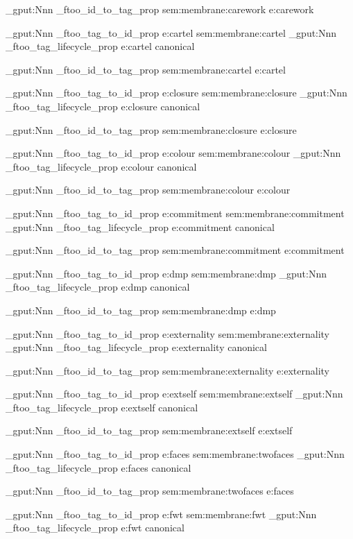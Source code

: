 \prop_gput:Nnn \g_ftoo_id_to_tag_prop { sem:membrane:carework } { e:carework }


\prop_gput:Nnn \g_ftoo_tag_to_id_prop { e:cartel } { sem:membrane:cartel }
\prop_gput:Nnn \g_ftoo_tag_lifecycle_prop { e:cartel } { canonical }

\prop_gput:Nnn \g_ftoo_id_to_tag_prop { sem:membrane:cartel } { e:cartel }


\prop_gput:Nnn \g_ftoo_tag_to_id_prop { e:closure } { sem:membrane:closure }
\prop_gput:Nnn \g_ftoo_tag_lifecycle_prop { e:closure } { canonical }

\prop_gput:Nnn \g_ftoo_id_to_tag_prop { sem:membrane:closure } { e:closure }


\prop_gput:Nnn \g_ftoo_tag_to_id_prop { e:colour } { sem:membrane:colour }
\prop_gput:Nnn \g_ftoo_tag_lifecycle_prop { e:colour } { canonical }

\prop_gput:Nnn \g_ftoo_id_to_tag_prop { sem:membrane:colour } { e:colour }


\prop_gput:Nnn \g_ftoo_tag_to_id_prop { e:commitment } { sem:membrane:commitment }
\prop_gput:Nnn \g_ftoo_tag_lifecycle_prop { e:commitment } { canonical }

\prop_gput:Nnn \g_ftoo_id_to_tag_prop { sem:membrane:commitment } { e:commitment }


\prop_gput:Nnn \g_ftoo_tag_to_id_prop { e:dmp } { sem:membrane:dmp }
\prop_gput:Nnn \g_ftoo_tag_lifecycle_prop { e:dmp } { canonical }

\prop_gput:Nnn \g_ftoo_id_to_tag_prop { sem:membrane:dmp } { e:dmp }


\prop_gput:Nnn \g_ftoo_tag_to_id_prop { e:externality } { sem:membrane:externality }
\prop_gput:Nnn \g_ftoo_tag_lifecycle_prop { e:externality } { canonical }

\prop_gput:Nnn \g_ftoo_id_to_tag_prop { sem:membrane:externality } { e:externality }


\prop_gput:Nnn \g_ftoo_tag_to_id_prop { e:extself } { sem:membrane:extself }
\prop_gput:Nnn \g_ftoo_tag_lifecycle_prop { e:extself } { canonical }

\prop_gput:Nnn \g_ftoo_id_to_tag_prop { sem:membrane:extself } { e:extself }


\prop_gput:Nnn \g_ftoo_tag_to_id_prop { e:faces } { sem:membrane:twofaces }
\prop_gput:Nnn \g_ftoo_tag_lifecycle_prop { e:faces } { canonical }

\prop_gput:Nnn \g_ftoo_id_to_tag_prop { sem:membrane:twofaces } { e:faces }


\prop_gput:Nnn \g_ftoo_tag_to_id_prop { e:fwt } { sem:membrane:fwt }
\prop_gput:Nnn \g_ftoo_tag_lifecycle_prop { e:fwt } { canonical }

